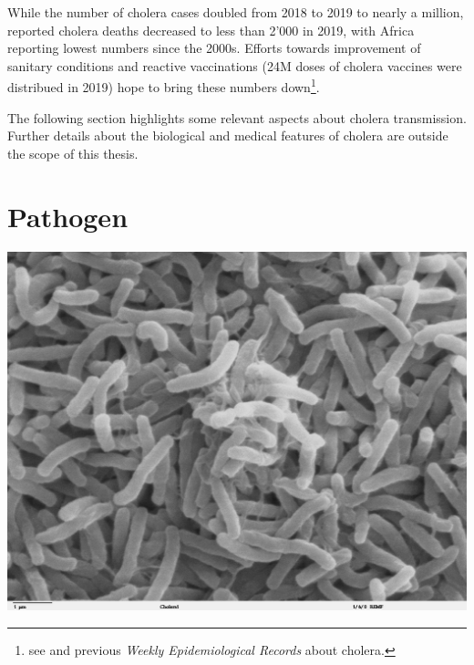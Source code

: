 While the number of cholera cases doubled from 2018 to 2019 to nearly a million, reported cholera deaths decreased to less than 2'000 in 2019, with Africa reporting lowest numbers since the 2000s. Efforts towards improvement of sanitary conditions and reactive vaccinations (24M doses of cholera vaccines were distribued in 2019) hope to bring these numbers down\footnote{see  and previous \textit{Weekly Epidemiological Records} about cholera.}. 

The following section highlights some relevant aspects about cholera transmission. Further details about the biological and medical features of cholera are outside the scope of this thesis.

\section{Pathogen} 
\begin{marginfigure}[6\baselineskip]
\centering
\includegraphics{fig/vibrio}
\label{fig:bacteria}
\end{marginfigure}
